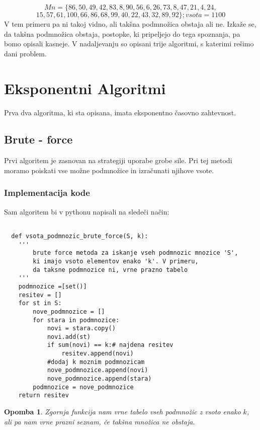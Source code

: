 \documentclass[12pt]{article}
\newtheorem{Opomba}[Izrek]{{\sc Opomba}}
\newenvironment{opomba}{\begin{Opomba}\rm}{\end{Opomba}}
\begin{document}
 \[Mn = \{86, 50, 49, 42, 83, 8, 90, 56, 6,26, 73, 8, 47, 21, 4, 24,\]
 \[15, 57, 61, 100, 66, 86, 68,  99, 40, 22, 43, 32, 89, 92\}; vsota = 1100\]\newline
V tem primeru pa ni takoj vidno, ali takšna podmnožica obstaja ali ne.
Izkaže se, da takšna podmnožica obstaja, postopke, ki pripeljejo do tega spoznanja, pa
bomo opisali kasneje.\newline
V nadaljevanju so opisani trije algoritmi, s katerimi 
rešimo dani problem.



\section{Eksponentni Algoritmi}
Prva dva algoritma, ki sta opisana, imata eksponentno časovno zahtevnost.
 

  \subsection{Brute - force}
  \label{sec:brute}
  Prvi algoritem je zasnovan na strategiji uporabe grobe sile.
  Pri tej metodi moramo poiskati vse možne podmnožice in izračunati njihove vsote.
  \subsubsection{Implementacija kode}  
  Sam algoritem bi v pythonu napisali na sledeči način:
  \label{sec:koda}
 \begin{lstlisting}

  def vsota_podmnozic_brute_force(S, k):
    '''
        brute force metoda za iskanje vseh podmnozic mnozice 'S',
        ki imajo vsoto elementov enako 'k'. V primeru, 
        da taksne podmnozice ni, vrne prazno tabelo
    '''
    podmnozice =[set()]
    resitev = []
    for st in S:
        nove_podmnozice = []
        for stara in podmnozice:
            novi = stara.copy()
            novi.add(st)
            if sum(novi) == k:# najdena resitev
                resitev.append(novi)
            #dodaj k moznim podmnozicam
            nove_podmnozice.append(novi)
            nove_podmnozice.append(stara)
        podmnozice = nove_podmnozice
    return resitev
  \end{lstlisting}
  \begin{opomba}
    Zgornja funkcija nam vrne tabelo vseh podmnožic z vsoto enako $k$, ali pa nam vrne prazni seznam,
    če takšna množica ne obstaja.
  \end{opomba}
  
\end{document}
